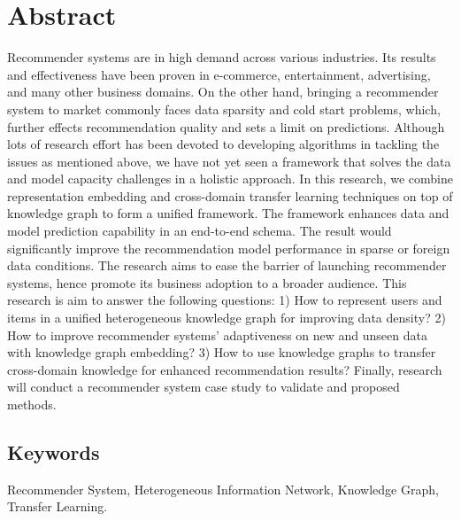 \section*{Abstract}
Recommender systems are in high demand across various industries. Its results and effectiveness have been proven in e-commerce, entertainment, advertising, and many other business domains.
On the other hand, bringing a recommender system to market commonly faces data sparsity and cold start problems, which, further effects recommendation quality and sets a limit on predictions. 
Although lots of research effort has been devoted to developing algorithms in tackling the issues as mentioned above, we have not yet seen a framework that solves the data and model capacity challenges in a holistic approach.
In this research, we combine representation embedding and cross-domain transfer learning techniques on top of knowledge graph to form a unified framework. The framework enhances data and model prediction capability in an end-to-end schema. The result would significantly improve the recommendation model performance in sparse or foreign data conditions. 
The research aims to ease the barrier of launching recommender systems, hence promote its business adoption to a broader audience. 
This research is aim to answer the following questions:
1) How to represent users and items in a unified heterogeneous knowledge graph for improving data density?
2) How to improve recommender systems' adaptiveness on new and unseen data with knowledge graph embedding?
3) How to use knowledge graphs to transfer cross-domain knowledge for enhanced recommendation results?
Finally, research will conduct a recommender system case study to validate and proposed methods.

\subsection*{Keywords} 
Recommender System, Heterogeneous Information Network, Knowledge Graph, Transfer Learning.